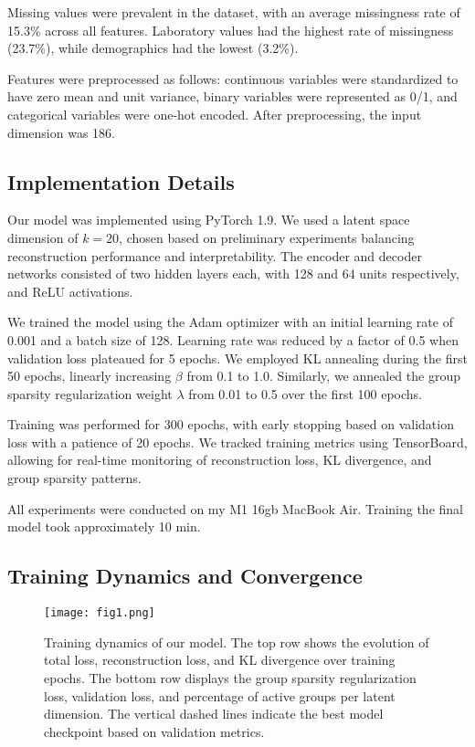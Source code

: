 \documentclass[oupdraft]{bio}
\begin{document}
Missing values were prevalent in the dataset, with an average missingness rate of 15.3\% across all features. Laboratory values had the highest rate of missingness (23.7\%), while demographics had the lowest (3.2\%).

Features were preprocessed as follows: continuous variables were standardized to have zero mean and unit variance, binary variables were represented as 0/1, and categorical variables were one-hot encoded. After preprocessing, the input dimension was 186.

\subsection{Implementation Details}

Our model was implemented using PyTorch 1.9. We used a latent space dimension of $k=20$, chosen based on preliminary experiments balancing reconstruction performance and interpretability. The encoder and decoder networks consisted of two hidden layers each, with 128 and 64 units respectively, and ReLU activations.

We trained the model using the Adam optimizer with an initial learning rate of 0.001 and a batch size of 128. Learning rate was reduced by a factor of 0.5 when validation loss plateaued for 5 epochs. We employed KL annealing during the first 50 epochs, linearly increasing $\beta$ from 0.1 to 1.0. Similarly, we annealed the group sparsity regularization weight $\lambda$ from 0.01 to 0.5 over the first 100 epochs.

Training was performed for 300 epochs, with early stopping based on validation loss with a patience of 20 epochs. We tracked training metrics using TensorBoard, allowing for real-time monitoring of reconstruction loss, KL divergence, and group sparsity patterns.

All experiments were conducted on my M1 16gb MacBook Air. Training the final model took approximately 10 min.

\subsection{Training Dynamics and Convergence}

\begin{figure}[t]
    \centering
    \texttt{[image: fig1.png]}
    \caption{Training dynamics of our model. The top row shows the evolution of total loss, reconstruction loss, and KL divergence over training epochs. The bottom row displays the group sparsity regularization loss, validation loss, and percentage of active groups per latent dimension. The vertical dashed lines indicate the best model checkpoint based on validation metrics.}
    \label{fig:training}
\end{figure}
\end{document}
